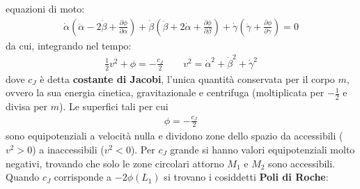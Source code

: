 \documentclass[a4paper, oneside]{book}
\begin{document}
equazioni di moto: 
\begin{gather*}
    \dot{\alpha}\left(\ddot{\alpha} - 2\dot{\beta} + \frac{\partial \phi}{\partial \alpha}    \right) + \dot{\beta}\left(\ddot{\beta} + 2\dot{\alpha} + \frac{\partial \phi}{\partial \beta}   \right)  + \dot{\gamma}\left(\ddot{\gamma} + \frac{\partial \phi}{\partial \gamma}  \right) = 0 
\end{gather*}
da cui, integrando nel tempo:
\begin{align}
    \boxed{\frac{1}{2}v^{2} + \phi = - \frac{c_J}{2}} \qquad v^{2} = \dot{\alpha}^{2} +\dot{\beta}^{2} + \dot{\gamma}^{2}   
\end{align}
dove $c_J$ è detta \textbf{costante di Jacobi}, l'unica quantità conservata per il corpo $m$, ovvero la sua 
energia cinetica, gravitazionale e centrifuga (moltiplicata per $-\frac{1}{2}$ e divisa 
per $m$). Le superfici tali per cui
\begin{gather*}
    \phi = -\frac{c_J}{2}
\end{gather*}
sono equipotenziali a velocità nulla e dividono zone 
dello spazio da accessibili ($v^{2} > 0$) a inaccessibili ($v^{2} < 0$). 
Per $c_J$ grande si hanno valori equipotenziali molto negativi, trovando che solo le
zone circolari attorno $M_1$ e $M_2$ sono accessibili.
Quando $c_J$ corrisponde a $-2\phi(L_1)$ si trovano i cosiddetti 
\textbf{Poli di Roche}:
\end{document}
